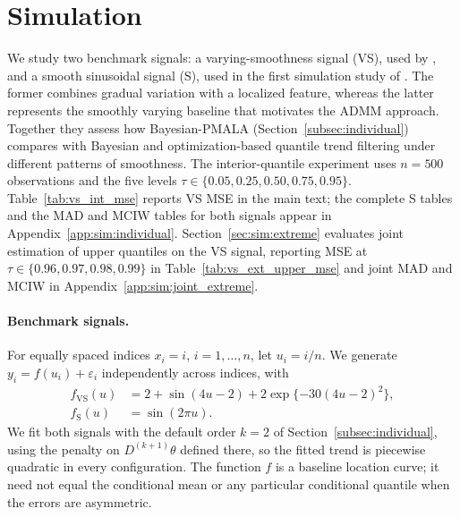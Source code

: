 \section{Simulation}
\label{sec:simulations}

We study two benchmark signals: a varying-smoothness signal (VS), used by \citet{onizuka2024fast}, and a smooth sinusoidal signal (S), used in the first simulation study of \citet{brantley2020baseline}. The former combines gradual variation with a localized feature, whereas the latter represents the smoothly varying baseline that motivates the ADMM approach. Together they assess how Bayesian-PMALA (Section~\ref{subsec:individual}) compares with Bayesian and optimization-based quantile trend filtering under different patterns of smoothness. The interior-quantile experiment uses $n=500$ observations and the five levels $\tau\in\{0.05,0.25,0.50,0.75,0.95\}$. Table~\ref{tab:vs_int_mse} reports VS MSE in the main text; the complete S tables and the MAD and MCIW tables for both signals appear in Appendix~\ref{app:sim:individual}. Section~\ref{sec:sim:extreme} evaluates joint estimation of upper quantiles on the VS signal, reporting MSE at $\tau\in\{0.96,0.97,0.98,0.99\}$ in Table~\ref{tab:vs_ext_upper_mse} and joint MAD and MCIW in Appendix~\ref{app:sim:joint_extreme}.

\paragraph{Benchmark signals.} For equally spaced indices $x_i=i$, $i=1,\ldots,n$, let $u_i=i/n$. We generate $y_i=f(u_i)+\varepsilon_i$ independently across indices, with
\begin{align}
 f_{\mathrm{VS}}(u)&=2+\sin(4u-2)+2\exp\{-30(4u-2)^2\},
 \label{eq:sim_vs}\\
 f_{\mathrm{S}}(u)&=\sin(2\pi u).
 \label{eq:sim_s}
\end{align}
We fit both signals with the default order $k=2$ of Section~\ref{subsec:individual}, using the penalty on $D^{(k+1)}\theta$ defined there, so the fitted trend is piecewise quadratic in every configuration. The function $f$ is a baseline location curve; it need not equal the conditional mean or any particular conditional quantile when the errors are asymmetric.

